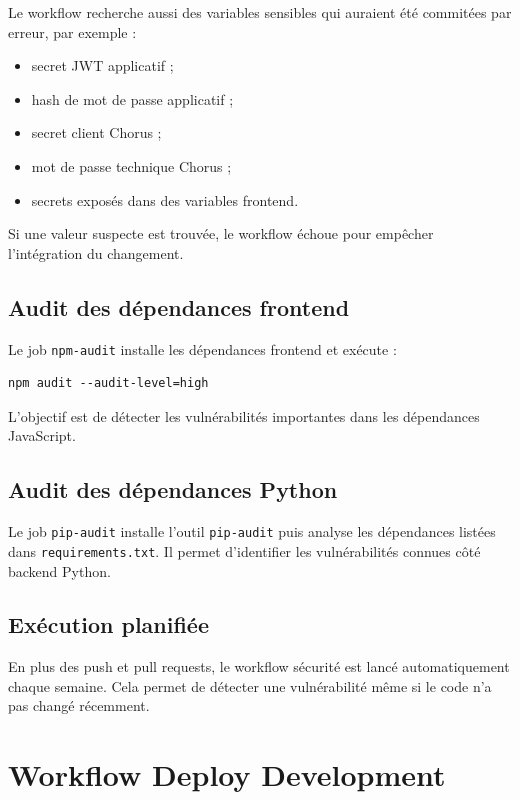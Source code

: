 \documentclass[11pt,a4paper]{article}
\begin{document}
Le workflow recherche aussi des variables sensibles qui auraient été commitées
par erreur, par exemple :

\begin{itemize}
  \item secret JWT applicatif ;
  \item hash de mot de passe applicatif ;
  \item secret client Chorus ;
  \item mot de passe technique Chorus ;
  \item secrets exposés dans des variables frontend.
\end{itemize}

Si une valeur suspecte est trouvée, le workflow échoue pour empêcher l'intégration
du changement.

\subsection{Audit des dépendances frontend}

Le job \texttt{npm-audit} installe les dépendances frontend et exécute :

\begin{lstlisting}
npm audit --audit-level=high
\end{lstlisting}

L'objectif est de détecter les vulnérabilités importantes dans les dépendances
JavaScript.

\subsection{Audit des dépendances Python}

Le job \texttt{pip-audit} installe l'outil \texttt{pip-audit} puis analyse les
dépendances listées dans \texttt{requirements.txt}. Il permet d'identifier les
vulnérabilités connues côté backend Python.

\subsection{Exécution planifiée}

En plus des push et pull requests, le workflow sécurité est lancé automatiquement
chaque semaine. Cela permet de détecter une vulnérabilité même si le code n'a pas
changé récemment.

\section{Workflow Deploy Development}
\end{document}
